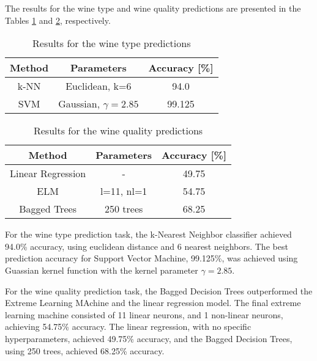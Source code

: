 The results for the wine type and wine quality predictions are presented in the Tables \ref{tab:type-results} and \ref{tab:quality-results}, respectively.

\begin{table}[H]
  \caption{Results for the wine type predictions}
  \centering
  \begin{tabular*}{0.48\textwidth}{c|c|c}
    \textbf{Method} & \textbf{Parameters} & \textbf{Accuracy [\%]} \\
    \midrule
    k-NN & Euclidean, k=6 & 94.0 \\
    SVM  & Gaussian, $\gamma=2.85$ & 99.125 \\
  \end{tabular*}
  \label{tab:type-results}
\end{table}

\begin{table}[H]
  \caption{Results for the wine quality predictions}
  \centering
  \begin{tabular*}{0.48\textwidth}{c|c|c}
    \textbf{Method} & \textbf{Parameters} & \textbf{Accuracy [\%]} \\
    \midrule
    Linear Regression & - & 49.75 \\
    ELM & l=11, nl=1 & 54.75 \\
    Bagged Trees & 250 trees & 68.25 \\
  \end{tabular*}
  \label{tab:quality-results}
\end{table}


For the wine type prediction task, the k-Nearest Neighbor classifier achieved 94.0\% accuracy, using euclidean distance and 6 nearest neighbors. The best prediction accuracy for Support Vector Machine, 99.125\%, was achieved using Guassian kernel function with the kernel parameter $\gamma=2.85$.

For the wine quality prediction task, the Bagged Decision Trees outperformed the Extreme Learning MAchine and the linear regression model. The final extreme learning machine consisted of 11 linear neurons, and 1 non-linear neurons, achieving 54.75\% accuracy. The linear regression, with no specific hyperparameters, achieved 49.75\% accuracy, and the Bagged Decision Trees, using 250 trees, achieved 68.25\% accuracy.




